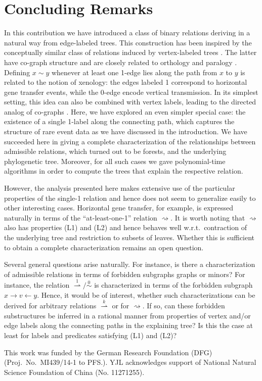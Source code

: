 \documentclass[smallextended]{svjour3}
\let\cite\citep
\newcommand{\Ro}{\mathrel{\overset{0}{\sim}}}
\newcommand{\Rld}{\mathrel{\overset{1}{\rightharpoonup}}}
\newcommand{\Rldk}{\mathrel{\overset{k}{\rightharpoonup}}}
\newcommand{\Rd}{\mathrel{\rightsquigarrow}}
\begin{document}
\section{Concluding Remarks} 

In this contribution we have introduced a class of binary relations
deriving in a natural way from edge-labeled trees. This construction has
been inspired by the conceptually similar class of relations induced by
vertex-labeled trees \cite{HW:17}. 
The latter have co-graph structure and are closely
related to orthology and paralogy
\cite{Hellmuth:13a,Lafond:14,Hellmuth:15a,HW:15}. Defining $x\sim y$ whenever at
least one 1-edge lies along the path from $x$ to $y$ is related to the
notion of xenology: the edges labeled 1 correspond to horizontal gene
transfer events, while the 0-edge encode vertical transmission. In its
simplest setting, this idea can also be combined with vertex labels,
leading to the directed analog of co-graphs \cite{HSW:16}. Here, we have
explored an even simpler special case: the existence of a single 1-label
along the connecting path, which captures the structure of rare event data
as we have discussed in the introduction.  We have succeeded here in giving
a complete characterization of the relationships between admissible
relations, which turned out to be forests, and the underlying phylogenetic
tree.  Moreover, for all such cases we gave polynomial-time algorithms in
order to compute the trees that explain the respective relation.  

However, the analysis presented here makes extensive use of the particular
properties of the single-1 relation and hence does not seem to generalize
easily to other interesting cases. Horizontal gene transfer, for
  example, is expressed naturally in terms of the ``at-least-one-1''
  relation $\Rd$. It is worth noting that $\Rd$ also has properties (L1)
  and (L2) and hence behaves well w.r.t.\ contraction of the underlying
  tree and restriction to subsets of leaves. Whether this is sufficient to
  obtain a complete characterization remains an open question.

Several general questions arise naturally. For instance, is there a
characterization of admissible relations in terms of forbidden subgraphs
graphs or minors? For instance, the relation $\Rld/\Ro$ is characterized in
terms of the forbidden subgraph $x\rightarrow v \leftarrow y$. Hence, it
would be of interest, whether such characterizations can be derived for
arbitrary relations $\Rldk$ or for $\Rd$.  If so, can these forbidden
substructures be inferred in a rational manner from properties of vertex
and/or edge labels along the connecting paths in the explaining tree?
Is this the case at least for labels and predicates satisfying (L1)
  and (L2)?

\begin{acknowledgements}
  This work was funded by the German Research Foundation (DFG) (Proj.\ No.\
  MI439/14-1 to PFS.).  YJL acknowledges support of National Natural
  Science Foundation of China (No. 11271255).
\end{acknowledgements}

%
%
%

\end{document}
